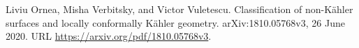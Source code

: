 Liviu Ornea, Misha Verbitsky, and Victor Vuletescu.
\newblock Classification of non-{K}{\"a}hler surfaces and locally conformally
  {K}{\"a}hler geometry.
\newblock arXiv:1810.05768v3, 26 June 2020.
\newblock URL \url{https://arxiv.org/pdf/1810.05768v3}.


